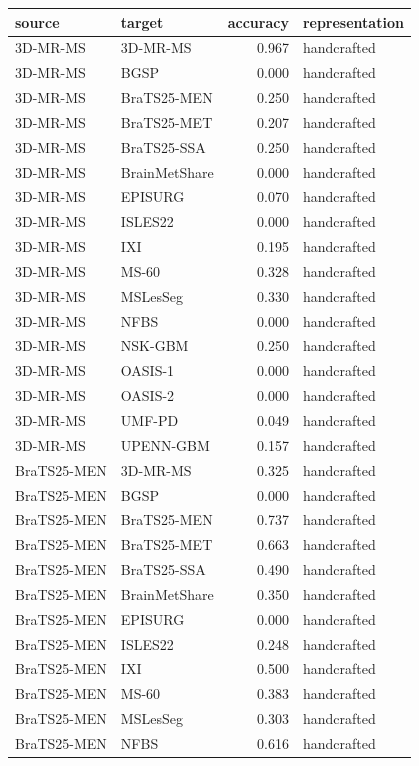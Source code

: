 \begin{tabular}{llrl}
\toprule
source & target & accuracy & representation \\
\midrule
3D-MR-MS & 3D-MR-MS & 0.967 & handcrafted \\
3D-MR-MS & BGSP & 0.000 & handcrafted \\
3D-MR-MS & BraTS25-MEN & 0.250 & handcrafted \\
3D-MR-MS & BraTS25-MET & 0.207 & handcrafted \\
3D-MR-MS & BraTS25-SSA & 0.250 & handcrafted \\
3D-MR-MS & BrainMetShare & 0.000 & handcrafted \\
3D-MR-MS & EPISURG & 0.070 & handcrafted \\
3D-MR-MS & ISLES22 & 0.000 & handcrafted \\
3D-MR-MS & IXI & 0.195 & handcrafted \\
3D-MR-MS & MS-60 & 0.328 & handcrafted \\
3D-MR-MS & MSLesSeg & 0.330 & handcrafted \\
3D-MR-MS & NFBS & 0.000 & handcrafted \\
3D-MR-MS & NSK-GBM & 0.250 & handcrafted \\
3D-MR-MS & OASIS-1 & 0.000 & handcrafted \\
3D-MR-MS & OASIS-2 & 0.000 & handcrafted \\
3D-MR-MS & UMF-PD & 0.049 & handcrafted \\
3D-MR-MS & UPENN-GBM & 0.157 & handcrafted \\
BraTS25-MEN & 3D-MR-MS & 0.325 & handcrafted \\
BraTS25-MEN & BGSP & 0.000 & handcrafted \\
BraTS25-MEN & BraTS25-MEN & 0.737 & handcrafted \\
BraTS25-MEN & BraTS25-MET & 0.663 & handcrafted \\
BraTS25-MEN & BraTS25-SSA & 0.490 & handcrafted \\
BraTS25-MEN & BrainMetShare & 0.350 & handcrafted \\
BraTS25-MEN & EPISURG & 0.000 & handcrafted \\
BraTS25-MEN & ISLES22 & 0.248 & handcrafted \\
BraTS25-MEN & IXI & 0.500 & handcrafted \\
BraTS25-MEN & MS-60 & 0.383 & handcrafted \\
BraTS25-MEN & MSLesSeg & 0.303 & handcrafted \\
BraTS25-MEN & NFBS & 0.616 & handcrafted \\

\end{tabular}
